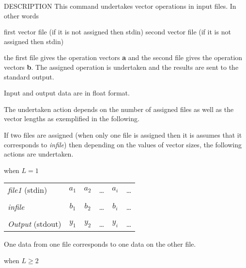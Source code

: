\begin{synopsis}
\item[vopr] [ --l $L$ ] [ --n $N$ ] [ --i ] [ --a ] [ --s ] [ --m ] [ --d ] 
\item[\ ~~~~] [ --ATAN2 ][ {\em file1} ] [ {\em infile} ]
\end{synopsis}

\begin{qsection}{DESCRIPTION}
This command undertakes vector operations in input files.
In other words
\begin{description}
first vector file (if it is not assigned then stdin)
second vector file (if it is not assigned then stdin)
\end{description}
the first file gives the operation vectors {\bf a}
and the second file gives the operation vectors {\bf b}.
The assigned operation is undertaken and the results
are sent to the standard output.
\par
Input and output data are in float format.
\par
The undertaken action depends on the number of assigned files
as well as the vector lengths as exemplified in the following.
\par
If two files are assigned (when only one file is assigned
then it is assumes that it corresponds to {\em infile}) then
depending on the values of vector sizes, the following actions
are undertaken.
\begin{description}
\item{when $L=1$}~\\
\begin{tabular}{l|c|c|c|c|c} \cline{2-6}
{\em file1} (stdin)	& {$a_1$} & {$a_2$} & {\dots}
			& {$a_i$} & {\dots} \\ \cline{2-6}
\multicolumn{6}{c}{}	\\[-10pt] \cline{2-6}
{\em infile}		& {$b_1$} & {$b_2$} & {\dots}
			& {$b_i$} & {\dots} \\ \cline{2-6}
\multicolumn{6}{c}{}	\\[-10pt] \cline{2-6}
{\em Output} (stdout)	& {$y_1$} & {$y_2$} & {\dots}
			& {$y_i$} & {\dots} \\ \cline{2-6}
\end{tabular}
\par
One data from one file corresponds to one data on the other file.
\item{when $L\geq 2$}~\\
\begin{tabular}{l|c|c|c|l} \cline{2-5}

\end{tabular}
\end{description}
\end{qsection}

